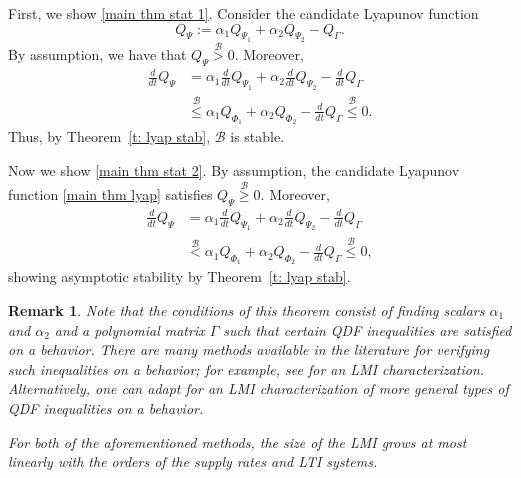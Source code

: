 \documentclass[letterpaper, 10 pt, conference]{ieeeconf}
\makeatletter
\renewenvironment{proof}[1][\proofname]{\par
\pushQED{\qed}%
\normalfont \topsep\z@
\trivlist
\item[\hskip2em
\itshape
#1\@addpunct{:}]\ignorespaces
}{%
\popQED\endtrivlist\@endpefalse
}
\theoremstyle{ieeeconf}
\newtheorem{remark}{Remark}
\newcommand{\B}{\mathcal{B}}
\makeatother
\begin{document}
\begin{proof}[Proof of Theorem~\ref{t: main diss inter thm}]
	First, we show \ref{main thm stat 1}. Consider the candidate Lyapunov function
	\begin{equation}
		Q_\Psi:= \alpha_1 Q_{\Psi_1}+\alpha_2 Q_{\Psi_2}-Q_\Gamma.
		\label{main thm lyap}
	\end{equation}
	By assumption, we have that $Q_\Psi \stackrel{\B}{>}0$. Moreover, 
	\begin{equation*}
		\begin{aligned}
			\frac{d}{dt}Q_\Psi &= \alpha_1\frac{d}{dt}Q_{\Psi_1}+\alpha_2 \frac{d}{dt}Q_{\Psi_2}  -\frac{d}{dt}Q_\Gamma \\
			&\stackrel{\B}{\leq} \alpha_1 Q_{\Phi_1} + \alpha_2 Q_{\Phi_2}-\frac{d}{dt}Q_\Gamma \stackrel{\B}{\leq} 0.
		\end{aligned}
	\end{equation*}
	Thus, by Theorem~\ref{t: lyap stab}, $\B$ is stable.
	
	Now we show \ref{main thm stat 2}. By assumption, the candidate Lyapunov function \eqref{main thm lyap} satisfies $Q_\Psi \stackrel{\B}{\geq }0$. Moreover, 
	\begin{equation*}
		\begin{aligned}
			\frac{d}{dt}Q_\Psi &= \alpha_1\frac{d}{dt}Q_{\Psi_1}+\alpha_2 \frac{d}{dt}Q_{\Psi_2}  -\frac{d}{dt}Q_\Gamma \\
			&\stackrel{\B}{<} \alpha_1 Q_{\Phi_1} + \alpha_2 Q_{\Phi_2}  -\frac{d}{dt}Q_\Gamma \stackrel{\B}{\leq} 0,
		\end{aligned}
	\end{equation*}
	showing asymptotic stability by Theorem~\ref{t: lyap stab}.
\end{proof}
\vspace{0.5ex}
\begin{remark}
	Note that the conditions of this theorem consist of finding scalars $\alpha_1$ and $\alpha_2$ and a polynomial matrix $\Gamma$ such that certain QDF inequalities are satisfied on a behavior. There are many methods available in the literature for verifying such inequalities on a behavior; for example, see \cite{cotroneo2000lmi} for an LMI characterization. 
	Alternatively, one can adapt \cite[Algorithm~8]{belur_algorithmic_2002} for an LMI characterization of more general types of QDF inequalities on a behavior.
	
	For both of the aforementioned methods, the size of the LMI grows at most linearly with the orders of the supply rates and LTI systems. 
	\label{main thm remark}
\end{remark}
\end{document}
